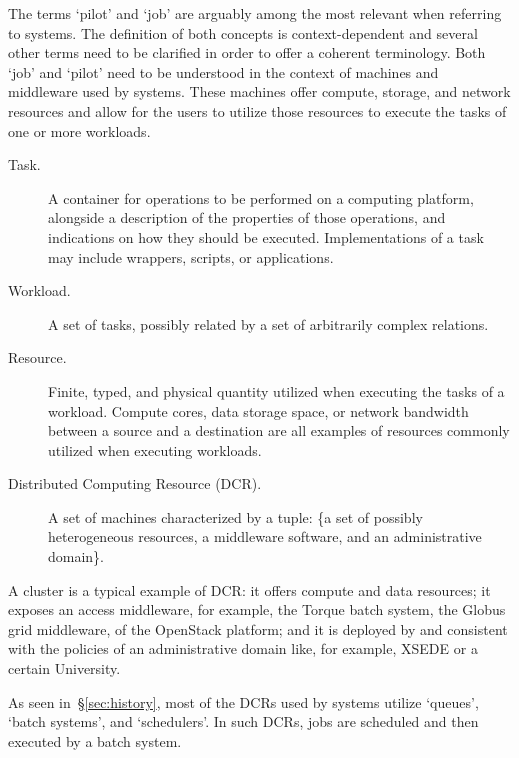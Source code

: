 \documentclass{sig-alternate}
\begin{document}
The terms `pilot' and `job' are arguably among the most relevant when referring
to \pilotjob systems. The definition of both concepts is context-dependent and
several other terms need to be clarified in order to offer a coherent
terminology. Both `job' and `pilot' need to be understood in the context of
machines and middleware used by \pilotjob systems. These machines offer compute,
storage, and network resources and \pilots allow for the users to utilize those
resources to execute the tasks of one or more workloads.

\begin{description}

\item[Task.] A container for operations to be performed on a computing
platform, alongside a description of the properties of those operations, and
indications on how they should be executed. Implementations of a task may
include wrappers, scripts, or applications.

\item[Workload.] A set of tasks, possibly related by a set of arbitrarily
complex relations.

\item[Resource.] Finite, typed, and physical quantity utilized when executing
the tasks of a workload. Compute cores, data storage space, or network
bandwidth between a source and a destination are all examples of resources
commonly utilized when executing workloads.

\item[Distributed Computing Resource (DCR).] A set of machines characterized by
  a tuple: \{a set of possibly heterogeneous resources, a middleware software,
  and an administrative domain\}. 

\end{description}

A cluster is a typical example of DCR: it offers compute and data resources; it
exposes an access middleware, for example, the Torque batch system, the Globus
grid middleware, of the OpenStack platform; and it is deployed by and consistent with the policies of an
administrative domain like, for example, XSEDE or a certain University.

As seen in~\S\ref{sec:history}, most of the DCRs used by \pilotjob systems
utilize `queues', `batch systems', and `schedulers'. In such DCRs, jobs are
scheduled and then executed by a batch system.
\end{document}
